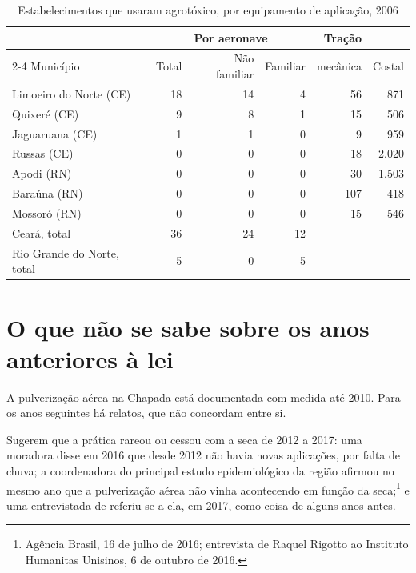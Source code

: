\begin{table}[ht]
\centering\small
\caption{Estabelecimentos que usaram agrotóxico, por equipamento de aplicação,
2006}
\label{tab:censo}
\begin{tabular}{@{}lrrrrr@{}}
\toprule
 & \multicolumn{3}{c}{Por aeronave} & Tração & \\
\cmidrule(lr){2-4}
Município & Total & Não familiar & Familiar & mecânica & Costal \\
\midrule
Limoeiro do Norte (CE) & 18 & 14 & 4 & 56 & 871 \\
Quixeré (CE)           &  9 &  8 & 1 & 15 & 506 \\
Jaguaruana (CE)        &  1 &  1 & 0 &  9 & 959 \\
Russas (CE)            &  0 &  0 & 0 & 18 & 2.020 \\
Apodi (RN)             &  0 &  0 & 0 & 30 & 1.503 \\
Baraúna (RN)           &  0 &  0 & 0 & 107 & 418 \\
Mossoró (RN)           &  0 &  0 & 0 & 15 & 546 \\
\midrule
Ceará, total           & 36 & 24 & 12 & & \\
Rio Grande do Norte, total & 5 & 0 & 5 & & \\
\bottomrule
\end{tabular}
\end{table}

\section{O que não se sabe sobre os anos anteriores à lei}
\label{sec:quando}

A pulverização aérea na Chapada está documentada com medida até 2010. Para os
anos seguintes há relatos, que não concordam entre si.

Sugerem que a prática rareou ou cessou com a seca de 2012 a 2017: uma moradora
disse em 2016 que desde 2012 não havia novas aplicações, por falta de chuva; a
coordenadora do principal estudo epidemiológico da região afirmou no mesmo ano
que a pulverização aérea não vinha acontecendo em função da
seca;\footnote{Agência Brasil, 16 de julho de 2016; entrevista de Raquel Rigotto
ao Instituto Humanitas Unisinos, 6 de outubro de 2016.} e uma entrevistada de
 referiu-se a ela, em 2017, como coisa de alguns anos
antes.

